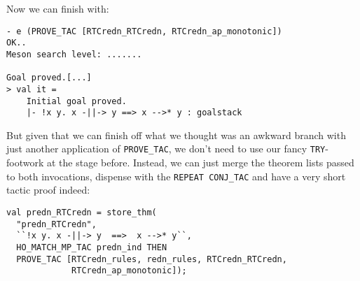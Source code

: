 Now we can finish with:
\begin{session}
\begin{verbatim}
- e (PROVE_TAC [RTCredn_RTCredn, RTCredn_ap_monotonic])
OK..
Meson search level: .......

Goal proved.[...]
> val it =
    Initial goal proved.
    |- !x y. x -||-> y ==> x -->* y : goalstack
\end{verbatim}
\end{session}
But given that we can finish off what we thought was an awkward branch
with just another application of \texttt{PROVE\_TAC}, we don't need to
use our fancy \texttt{TRY}-footwork at the stage before.  Instead, we
can just merge the theorem lists passed to both invocations, dispense
with the \texttt{REPEAT CONJ\_TAC} and have a very short tactic proof
indeed:
\begin{session}
\begin{verbatim}
val predn_RTCredn = store_thm(
  "predn_RTCredn",
  ``!x y. x -||-> y  ==>  x -->* y``,
  HO_MATCH_MP_TAC predn_ind THEN
  PROVE_TAC [RTCredn_rules, redn_rules, RTCredn_RTCredn,
             RTCredn_ap_monotonic]);
\end{verbatim}
\end{session}
\eos{}

